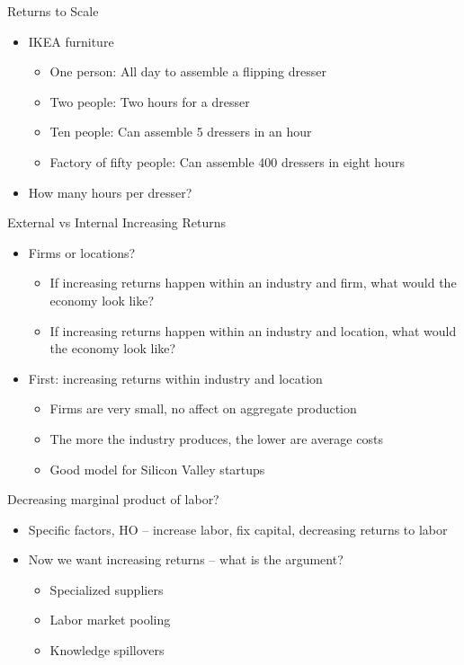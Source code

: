 \documentclass[ignorenonframetext,]{beamer}
\begin{document}
\begin{frame}{Returns to Scale}
    \begin{itemize}
        \item IKEA furniture
        \begin{itemize}
            \item One person: All day to assemble a flipping dresser
            \item Two people: Two hours for a dresser
            \item Ten people: Can assemble 5 dressers in an hour 
            \item Factory of fifty people: Can assemble 400 dressers in eight hours
        \end{itemize}
        \item How many hours per dresser?
    \end{itemize}

\end{frame}

\begin{frame}{External vs Internal Increasing Returns}
    \begin{itemize}
        \item Firms or locations?
        \begin{itemize}
            \item If increasing returns happen within an industry and firm, what would the economy look like?
            \item If increasing returns happen within an industry and location, what would the economy look like? 
        \end{itemize}
        \item First: increasing returns within industry and location
        \begin{itemize}
            \item Firms are very small, no affect on aggregate production 
            \item The more the industry produces, the lower are average costs
            \item Good model for Silicon Valley startups
        \end{itemize}
    \end{itemize}
\end{frame}
\begin{frame}{Decreasing marginal product of labor?}

    \begin{itemize}
        \item Specific factors, HO -- increase labor, fix capital, decreasing returns to labor
        \item Now we want increasing returns -- what is the argument?
        \begin{itemize}
            \item Specialized suppliers
            \item Labor market pooling
            \item Knowledge spillovers
        \end{itemize}
    \end{itemize}

\end{frame}
\end{document}
